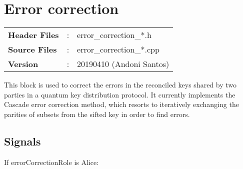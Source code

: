 \clearpage
\graphicspath{{./lib/error_correction/figures/}}
\section{Error correction}

\begin{tcolorbox}	
	\begin{tabular}{p{2.75cm} p{0.2cm} p{10.5cm}} 	
        \textbf{Header Files}    &:& error\_correction\_*.h \\
		\textbf{Source Files}    &:& error\_correction\_*.cpp \\
        \textbf{Version}         &:& 20190410 (Andoni Santos)
	\end{tabular}
\end{tcolorbox}

\maketitle
This block is used to correct the errors in the reconciled keys shared by two
parties in a quantum key distribution protocol. It currently implements the
Cascade error correction method, which resorts to iteratively exchanging
the parities of subsets from the sifted key in order to find errors.



\subsection*{Signals}

If errorCorrectionRole is Alice:


